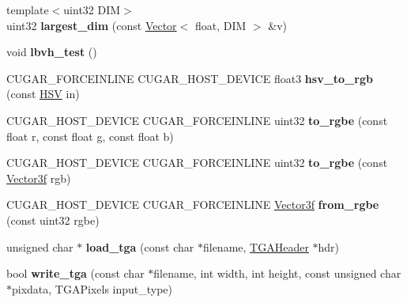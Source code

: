 \begin{DoxyCompactItemize}
\mbox{\label{namespacecugar_a52a874d8b062de45b97d20a60a53fd52}} 
{\footnotesize template$<$uint32 D\+IM$>$ }\\uint32 {\bfseries largest\+\_\+dim} (const \hyperlink{structcugar_1_1_vector}{Vector}$<$ float, D\+IM $>$ \&v)
\item 
\mbox{\label{namespacecugar_a64f2b59237ab60cb8e5c866be3734fe6}} 
void {\bfseries lbvh\+\_\+test} ()
\item 
\mbox{\label{namespacecugar_a75a6c64d31a8d772601abd148749e489}} 
C\+U\+G\+A\+R\+\_\+\+F\+O\+R\+C\+E\+I\+N\+L\+I\+NE C\+U\+G\+A\+R\+\_\+\+H\+O\+S\+T\+\_\+\+D\+E\+V\+I\+CE float3 {\bfseries hsv\+\_\+to\+\_\+rgb} (const \hyperlink{structcugar_1_1_h_s_v}{H\+SV} in)
\item 
\mbox{\label{namespacecugar_af27c4db8073e258e69a835d81e905b62}} 
C\+U\+G\+A\+R\+\_\+\+H\+O\+S\+T\+\_\+\+D\+E\+V\+I\+CE C\+U\+G\+A\+R\+\_\+\+F\+O\+R\+C\+E\+I\+N\+L\+I\+NE uint32 {\bfseries to\+\_\+rgbe} (const float r, const float g, const float b)
\item 
\mbox{\label{namespacecugar_a48c91e7022925e9288a573bd5043592e}} 
C\+U\+G\+A\+R\+\_\+\+H\+O\+S\+T\+\_\+\+D\+E\+V\+I\+CE C\+U\+G\+A\+R\+\_\+\+F\+O\+R\+C\+E\+I\+N\+L\+I\+NE uint32 {\bfseries to\+\_\+rgbe} (const \hyperlink{structcugar_1_1_vector}{Vector3f} rgb)
\item 
\mbox{\label{namespacecugar_acb42b3c31b3e43aaa832ec8d0fa4b46c}} 
C\+U\+G\+A\+R\+\_\+\+H\+O\+S\+T\+\_\+\+D\+E\+V\+I\+CE C\+U\+G\+A\+R\+\_\+\+F\+O\+R\+C\+E\+I\+N\+L\+I\+NE \hyperlink{structcugar_1_1_vector}{Vector3f} {\bfseries from\+\_\+rgbe} (const uint32 rgbe)
\item 
\mbox{\label{namespacecugar_a452d6bcec635d49ff07a942cd1316fc4}} 
unsigned char $\ast$ {\bfseries load\+\_\+tga} (const char $\ast$filename, \hyperlink{structcugar_1_1_t_g_a_header}{T\+G\+A\+Header} $\ast$hdr)
\item 
\mbox{\label{namespacecugar_a0c61db212822c20f8df072be24bd975b}} 
bool {\bfseries write\+\_\+tga} (const char $\ast$filename, int width, int height, const unsigned char $\ast$pixdata, T\+G\+A\+Pixels input\+\_\+type)

\end{DoxyCompactItemize}
